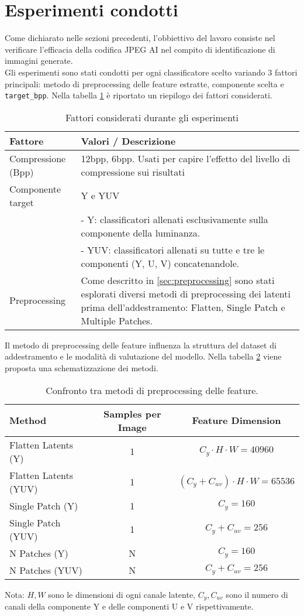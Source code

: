 \section{Esperimenti condotti}\label{sec:experiments}
Come dichiarato nelle sezioni precedenti, l'obbiettivo del lavoro consiste nel verificare l'efficacia della codifica JPEG AI nel compito di identificazione di immagini generate.\\
Gli esperimenti sono stati condotti per ogni classificatore scelto variando 3 fattori principali:  metodo di preprocessing delle feature estratte, componente scelta e \texttt{target\_bpp}. Nella tabella \ref{tab:experimentalfactors} è riportato un riepilogo dei fattori considerati.
\begin{table}[H]
\centering
\caption{Fattori considerati durante gli esperimenti}\label{tab:experimentalfactors}
\begin{tabularx}{\textwidth}{l X}
\toprule
\textbf{Fattore} & \textbf{Valori / Descrizione} \\
\midrule
Compressione (Bpp) & 12bpp, 6bpp. Usati per capire l'effetto del livello di compressione sui risultati \\
\midrule
Componente target & Y e YUV \\
& - Y: classificatori allenati esclusivamente sulla componente della luminanza. \\
& - YUV: classificatori allenati su tutte e tre le componenti (Y, U, V) concatenandole. \\
\midrule
Preprocessing & Come descritto in \ref{sec:preprocessing} sono stati esplorati diversi metodi di preprocessing dei latenti prima dell'addestramento: Flatten, Single Patch e Multiple Patches. \\
\bottomrule
\end{tabularx}
\end{table}
Il metodo di preprocessing delle feature influenza la struttura del dataset di addestramento e le modalità di valutazione del modello. Nella tabella \ref{tab:preprocessing_methods} viene proposta una schematizzazione dei metodi.
\begin{table}[H]
\centering
\caption{Confronto tra metodi di preprocessing delle feature.}\label{tab:preprocessing_methods}
\begin{tabularx}{\textwidth}{l c c}
\toprule
\textbf{Method} & \textbf{Samples per Image} & \textbf{Feature Dimension} \\
\midrule
Flatten Latents (Y)        & 1 & $C_y \cdot H \cdot W = 40960$ \\
Flatten Latents (YUV)     & 1 & $(C_y +C_{uv})\cdot H \cdot W = 65536$ \\
Single Patch (Y)        & 1 & $C_y = 160$ \\
Single Patch (YUV)     & 1 & $C_y + C_{uv} = 256$ \\
N Patches (Y)    & N & $C_y = 160$ \\
N Patches (YUV)        & N & $C_y + C_{uv} = 256$ \\
\bottomrule
\end{tabularx}
\small{Nota: $H,W$ sono le dimensioni di ogni canale latente, $C_y, C_{uv}$ sono il numero di canali della componente Y e delle componenti U e V rispettivamente.}
\end{table}
